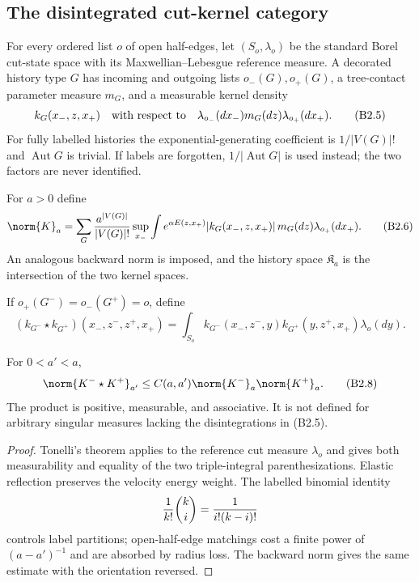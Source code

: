 \subsection{The disintegrated cut-kernel category}

For every ordered list $o$ of open half-edges, let $(S_o,\lambda_o)$ be the
standard Borel cut-state space with its Maxwellian--Lebesgue reference
measure.  A decorated history type $G$ has incoming and outgoing lists
$o_-(G),o_+(G)$, a tree-contact parameter measure $m_G$, and a measurable
kernel density
\[
 k_G(x_-,z,x_+)\quad\hbox{with respect to}\quad
 \lambda_{o_-}(dx_-)m_G(dz)\lambda_{o_+}(dx_+).           \tag{B2.5}
\]
For fully labelled histories the exponential-generating coefficient is
$1/|V(G)|!$ and $\operatorname{Aut}G$ is trivial.  If labels are forgotten,
$1/|\operatorname{Aut}G|$ is used instead; the two factors are never
identified.

For $a>0$ define
\[
 \norm{K}_{a}=
 \sum_G{a^{|V(G)|}\over |V(G)|!}
 \sup_{x_-}\int e^{\alpha E(z,x_+)}
 |k_G(x_-,z,x_+)|\,m_G(dz)\lambda_{o_+}(dx_+).            \tag{B2.6}
\]
An analogous backward norm is imposed, and the history space
$\mathfrak K_a$ is the intersection of the two kernel spaces.

If $o_+(G^-)=o_-(G^+)=o$, define
\[
 (k_{G^-}\star k_{G^+})(x_-,z^-,z^+,x_+)
 =\int_{S_o}k_{G^-}(x_-,z^-,y)k_{G^+}(y,z^+,x_+)
   \lambda_o(dy).                                        \tag{B2.7}
\]

\begin{proposition}
\label{prop:r29-b2-algebra}
For $0<a'<a$,
\[
 \norm{K^-\star K^+}_{a'}
 \le C(a,a')\norm{K^-}_{a}\norm{K^+}_{a}.                \tag{B2.8}
\]
The product is positive, measurable, and associative.  It is not defined for
arbitrary singular measures lacking the disintegrations in (B2.5).
\end{proposition}

\begin{proof}
Tonelli's theorem applies to the reference cut measure $\lambda_o$ and gives
both measurability and equality of the two triple-integral parenthesizations.
Elastic reflection preserves the velocity energy weight.  The labelled
binomial identity
\[
 {1\over k!}{k\choose i}={1\over i!(k-i)!}
\]
controls label partitions; open-half-edge matchings cost a finite power of
$(a-a')^{-1}$ and are absorbed by radius loss.  The backward norm gives the
same estimate with the orientation reversed.
\end{proof}

